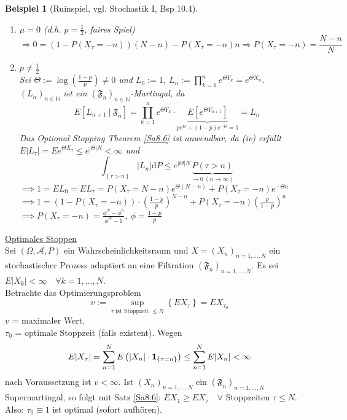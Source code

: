 \documentclass[a4paper,11pt]{scrbook}
\newcommand{\N}{{\mathbb N}}
\newcommand{\ind}{\text{\bf{1}}}
\def\AA{ \mathcal{A} }
\def\FF{ \mathfrak{F} }
\def\folgt{\ensuremath{\implies}}
\def\d{\mbox{d}}
\newtheorem{Bsp}{Beispiel}[chapter]
\theoremstyle{nonumberplain}
\begin{document}
\begin{Bsp}[Ruinspiel, vgl. Stochastik I, Bsp 10.4]
\begin{enumerate}
\item[Fall 1:] $\mu = 0$ (d.h. $p = \frac12$, faires Spiel)
\[
\Rightarrow 0 = (1-P(X_{\tau} = -n))(N-n) - P(X_{\tau} = -n)n \Rightarrow P(X_{\tau} = -n) = \frac{N-n}{N}
\]

\item[Fall 2:] $p \neq \frac12$ \\
Sei $\Theta := \log(\frac{1-p}{p}) \neq 0$ und $L_0 := 1$, $L_n := \prod_{k=1}^n e^{\Theta Y_k} = e^{\Theta X_n}$. \\
$(L_n)_{n\in\N}$ ist ein $(\FF_n)_{n\in\N}$-Martingal, da
$$E\left[L_{n+1}\ |\ \FF_n\right] = \prod_{k=1}^n e^{\Theta Y_k} \cdot \underbrace{E\left[ e^{\Theta Y_{n+1}} \right]}_{pe^{\Theta} + (1-p)e^{-\Theta} = 1} = L_n$$
Das Optional Stopping Theorem \ref{Sa8.6} ist anwendbar, da (iv) erfüllt \\
$E|L_{\tau}| = Ee^{\Theta X_{\tau}} \leq e^{|\Theta|N} < \infty$ und
$$\int_{\left\{ \tau > n \right\}} |L_n| \d P \leq e^{|\Theta|N} \underbrace{P\left( \tau > n \right)}_{\to 0\ (n\to\infty)}$$
$\folgt 1 = EL_0 = EL_{\tau} = P(X_{\tau} = N-n)e^{\Theta(N-n)} + P(X_{\tau} = -n)e^{-\Theta n}$ \\
$\folgt 1 = (1 - P(X_{\tau} = -n))\cdot(\frac{1-p}{p})^{N-n} + P(X_{\tau} = -n)(\frac{p}{1-p})^n$ \\
$\folgt P(X_{\tau} = -n) = \frac{\phi^N - \phi^n}{\phi^N - 1},\ \phi = \frac{1-p}{p}$
\end{enumerate}
\end{Bsp}

\underline{Optimales Stoppen} \\
Sei $(\Omega,\AA,P)$ ein Wahrscheinlichkeitsraum und $X = (X_n)_{n=1,\dots,N}$ ein stochastischer Prozess adaptiert an eine Filtration $(\FF_n)_{n=1,\dots,N}$. Es sei $E|X_k| < \infty \quad\forall k=1,\dots,N$. \\
Betrachte das Optimierungsproblem
$$v := \sup_{\tau\text{ ist Stoppzeit }\leq N} \left\{ EX_{\tau} \right\} = EX_{\tau_0}$$
$v$ = maximaler Wert, \\
$\tau_0$ = optimale Stoppzeit (falls existent). Wegen
$$E|X_{\tau}| = \sum_{n=1}^N E\left( |X_n|\cdot\ind_{\left\{ \tau = n \right\}} \right) \leq \sum_{n=1}^N E|X_n| < \infty$$
nach Voraussetzung ist $v < \infty$. Ist $(X_n)_{n=1,\dots,N}$ ein $(\FF_n)_{n=1,\dots,N}$ Supermartingal, so folgt mit Satz \ref{Sa8.6}: $EX_1 \geq EX_{\tau} \quad\forall$ Stoppzeiten $\tau \leq N$. \\
Also: $\tau_0 \equiv 1$ ist optimal (sofort aufhören).
\end{document}
